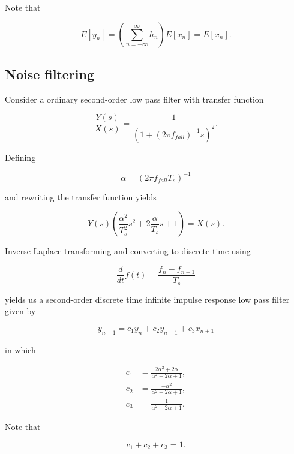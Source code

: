 \documentclass[11pt,titlepage]{report}
\begin{document}
\begin{appendices}
Note that

\begin{equation}
	E[y_n] = \left( \sum_{n=-\infty}^{\infty} h_n \right) E[x_n] = E[x_n].
\end{equation}

\subsection{Noise filtering}

Consider a ordinary second-order low pass filter with transfer function

\begin{equation}
	\frac{Y(s)}{X(s)}=\frac{1}{(1+(2 \pi f_{fall})^{-1} s)^2}.
\end{equation}

Defining

\begin{equation}
	\alpha = (2 \pi f_{fall} T_s)^{-1}
\end{equation}

and rewriting the transfer function yields

\begin{equation}
	Y(s) \left(\frac{\alpha^2}{T_s^2} s^2 + 2 \frac{\alpha}{T_s} s + 1 \right) = X(s).
\end{equation}

Inverse Laplace transforming and converting to discrete time using

\begin{equation}
	\frac{d}{dt}f(t) = \frac{f_n - f_{n-1}}{T_s}
\end{equation}

yields us a second-order discrete time infinite impulse response low pass filter given by

\begin{equation}
	y_{n+1} = c_1 y_n + c_2 y_{n-1} + c_3 x_{n+1}
\end{equation}

in which

\begin{align}
	c_1 &= \frac{2 \alpha^2 + 2 \alpha}{\alpha^2 + 2 \alpha + 1}, \\
	c_2 &= \frac{-\alpha^2}{\alpha^2 + 2 \alpha + 1}, \\
	c_3 &= \frac{1}{\alpha^2+2 \alpha + 1}.
\end{align}

Note that

\begin{equation}
	c_1 + c_2 + c_3 = 1.
\end{equation}


\end{appendices}
\end{document}
